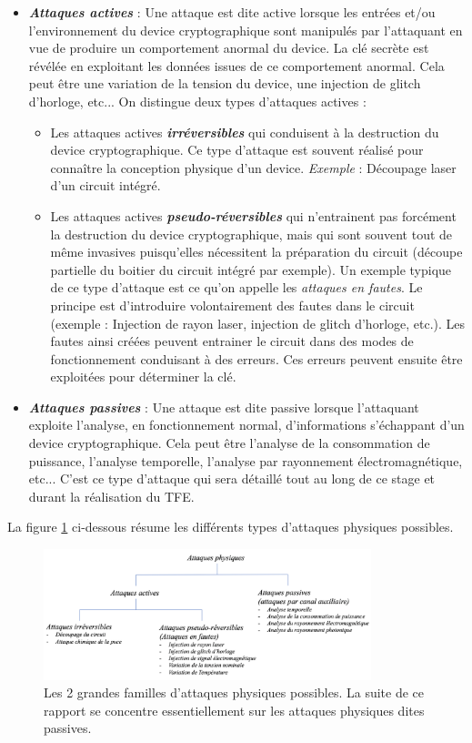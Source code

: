 \documentclass[oneside]{book}
\begin{document}
\begin{itemize}
\item \textbf{\textit{Attaques actives}} : Une attaque est dite active lorsque les entrées et/ou l'environnement du device cryptographique sont manipulés par l'attaquant en vue de produire un comportement anormal du device. La clé secrète est révélée en exploitant les données issues de ce comportement anormal. Cela peut être une variation de la tension du device, une injection de glitch d'horloge, etc... On distingue deux types d'attaques actives : 
\begin{itemize}
\item Les attaques actives \textbf{\textit{irréversibles}} qui conduisent à la destruction du device cryptographique. Ce type d'attaque est souvent réalisé pour connaître la conception physique d'un device. \textit{Exemple} : Découpage laser d’un circuit intégré.
\item Les attaques actives \textbf{\textit{pseudo-réversibles}} qui n’entrainent pas forcément la destruction du device cryptographique, mais qui sont souvent tout de même invasives puisqu’elles nécessitent la préparation du circuit (découpe partielle du boitier du circuit intégré par exemple). Un exemple typique de ce type d'attaque est ce qu'on appelle les \textit{attaques en fautes}. Le principe est d'introduire volontairement des fautes dans le circuit (exemple : Injection de rayon laser, injection de glitch d’horloge, etc.). Les fautes ainsi créées peuvent entrainer le circuit dans des modes de fonctionnement conduisant à des erreurs. Ces erreurs peuvent ensuite être exploitées pour déterminer la clé.
\end{itemize}
\item \textbf{\textit{Attaques passives}} : Une attaque est dite passive lorsque l'attaquant exploite l'analyse, en fonctionnement normal, d'informations s'échappant d'un device cryptographique. Cela peut être l'analyse de la consommation de puissance, l'analyse temporelle, l'analyse par rayonnement électromagnétique, etc... C'est ce type d'attaque qui sera détaillé tout au long de ce stage et durant la réalisation du TFE. \\
\end{itemize}

\vspace{-0.3 cm}La figure \ref{fig:attaques} ci-dessous résume les différents types d'attaques physiques possibles.
\begin{figure}[htbp]
    \centering
    \includegraphics[width=0.85\textwidth]{image/attaques}
    \caption{Les 2 grandes familles d'attaques physiques possibles. La suite de ce rapport se concentre essentiellement sur les attaques physiques dites passives.}
    \label{fig:attaques}
\end{figure}
\end{document}
